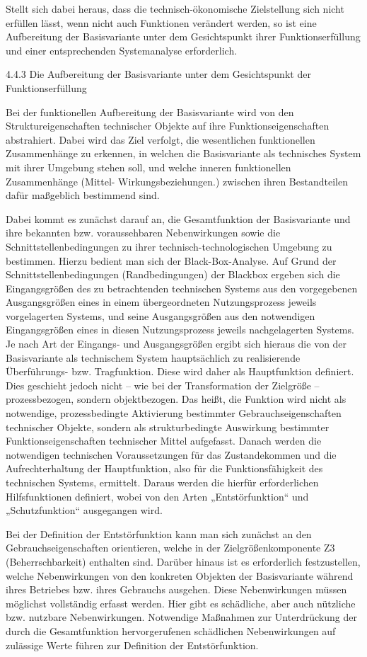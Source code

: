 \documentclass[12pt,a4paper]{article}
\begin{document}
Stellt sich dabei heraus, dass die technisch-ökonomische Zielstellung sich
nicht erfüllen lässt, wenn nicht auch Funktionen verändert werden, so ist eine
Aufbereitung der Basisvariante unter dem Gesichtspunkt ihrer
Funktionserfüllung und einer entsprechenden Systemanalyse erforderlich.


4.4.3 Die Aufbereitung der Basisvariante unter dem Gesichtspunkt der
Funktionserfüllung

Bei der funktionellen Aufbereitung der Basisvariante wird von den
Struktureigenschaften technischer Objekte auf ihre Funktionseigenschaften
abstrahiert. Dabei wird das Ziel verfolgt, die wesentlichen funktionellen
Zusammenhänge zu erkennen, in welchen die Basisvariante als technisches System
mit ihrer Umgebung stehen soll, und welche inneren funktionellen Zusammenhänge
(Mittel- Wirkungsbeziehungen.) zwischen ihren Bestandteilen dafür maßgeblich
bestimmend sind.

Dabei kommt es zunächst darauf an, die Gesamtfunktion der Basisvariante und
ihre bekannten bzw. voraussehbaren Nebenwirkungen sowie die
Schnittstellenbedingungen zu ihrer technisch-technologischen Umgebung zu
bestimmen. Hierzu bedient man sich der Black-Box-Analyse. Auf Grund der
Schnittstellenbedingungen (Randbedingungen) der Blackbox ergeben sich die
Eingangsgrößen des zu betrachtenden technischen Systems aus den vorgegebenen
Ausgangsgrößen eines in einem übergeordneten Nutzungsprozess jeweils
vorgelagerten Systems, und seine Ausgangsgrößen aus den notwendigen
Eingangsgrößen eines in diesen Nutzungsprozess jeweils nachgelagerten
Systems. Je nach Art der Eingangs- und Ausgangsgrößen ergibt sich hieraus die
von der Basisvariante als technischem System hauptsächlich zu realisierende
Überführungs- bzw. Tragfunktion. Diese wird daher als Hauptfunktion
definiert. Dies geschieht jedoch nicht -- wie bei der Transformation der
Zielgröße -- prozessbezogen, sondern objektbezogen. Das heißt, die Funktion
wird nicht als notwendige, prozessbedingte Aktivierung bestimmter
Gebrauchseigenschaften technischer Objekte, sondern als strukturbedingte
Auswirkung bestimmter Funktionseigenschaften technischer Mittel
aufgefasst. Danach werden die notwendigen technischen Voraussetzungen für das
Zustandekommen und die Aufrechterhaltung der Hauptfunktion, also für die
Funktionsfähigkeit des technischen Systems, ermittelt. Daraus werden die
hierfür erforderlichen Hilfsfunktionen definiert, wobei von den Arten
„Entstörfunktion“ und „Schutzfunktion“ ausgegangen wird.

Bei der Definition der Entstörfunktion kann man sich zunächst an den
Gebrauchseigenschaften orientieren, welche in der Zielgrößenkomponente Z3
(Beherrschbarkeit) enthalten sind. Darüber hinaus ist es erforderlich
festzustellen, welche Nebenwirkungen von den konkreten Objekten der
Basisvariante während ihres Betriebes bzw. ihres Gebrauchs ausgehen. Diese
Nebenwirkungen müssen möglichst vollständig erfasst werden. Hier gibt es
schädliche, aber auch nützliche bzw. nutzbare Nebenwirkungen. Notwendige
Maßnahmen zur Unterdrückung der durch die Gesamtfunktion hervorgerufenen
schädlichen Nebenwirkungen auf zulässige Werte führen zur Definition der
Entstörfunktion.
\end{document}
